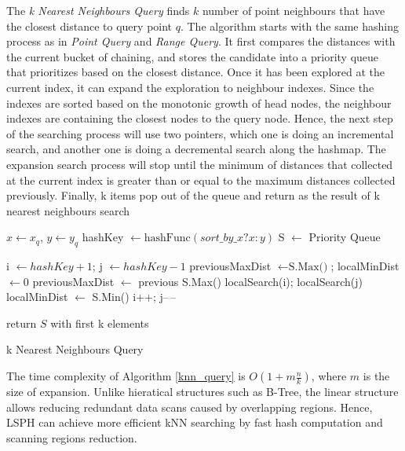The \textit{k Nearest Neighbours Query} finds $k$ number of point neighbours that have the closest distance to query point $q$. The algorithm starts with the same hashing process as in \textit{Point Query} and \textit{Range Query}. It first compares the distances with the current bucket of chaining, and stores the candidate into a priority queue that prioritizes based on the closest distance. Once it has been explored at the current index, it can expand the exploration to neighbour indexes. Since the indexes are sorted based on the monotonic growth of head nodes, the neighbour indexes are containing the closest nodes to the query node. Hence, the next step of the searching process will use two pointers, which one is doing an incremental search, and another one is doing a decremental search along the hashmap. The expansion search process will stop until the minimum of distances that collected at the current index is greater than or equal to the maximum distances collected previously.  Finally, k items pop out of the queue and return as the result of k nearest neighbours search

\begin{algorithm}[H] \label{knn_query}
\SetAlgoLined
{}
$x\leftarrow{x_q}$, $y\leftarrow{y_q}$\;
hashKey $\leftarrow{\text{hashFunc}(sort\_by\_x ? x : y)}$\;
S $\leftarrow$ Priority Queue\;




i $\leftarrow{hashKey+1}$; 
j $\leftarrow{hashKey-1}$\; 
previousMaxDist $\leftarrow{\text{S.Max()}}$;
localMinDist $\leftarrow{0}$\;
 {
    previousMaxDist $\leftarrow$ previous S.Max()\;
    localSearch(i); localSearch(j)\;
    localMinDist $\leftarrow$ S.Min()\;
    i++; j--\,--\;
 }
 
 
 return $S$ with first k elements\;
 \caption{k Nearest Neighbours Query}
\end{algorithm}


The time complexity of Algorithm \ref{knn_query} is $O(1 + m\frac{n}{k})$, where $m$ is the size of expansion. Unlike hieratical structures such as B-Tree, the linear structure allows reducing redundant data scans caused by overlapping regions. Hence, LSPH can achieve more efficient kNN searching by fast hash computation and scanning regions reduction. 



